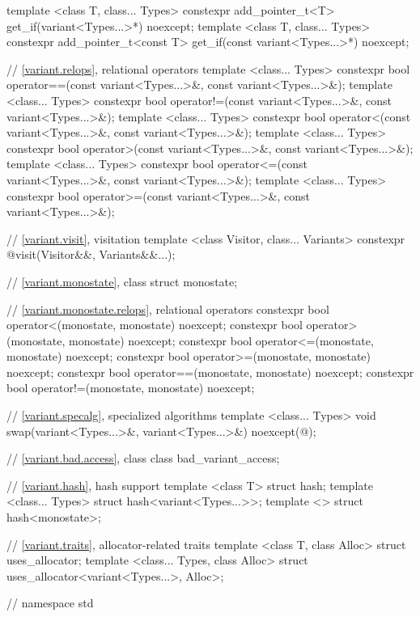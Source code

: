 \begin{codeblock}
{  template <class T, class... Types>
    constexpr add_pointer_t<T> get_if(variant<Types...>*) noexcept;
  template <class T, class... Types>
    constexpr add_pointer_t<const T> get_if(const variant<Types...>*) noexcept;

  // \ref{variant.relops}, relational operators
  template <class... Types>
    constexpr bool operator==(const variant<Types...>&,
                              const variant<Types...>&);
  template <class... Types>
    constexpr bool operator!=(const variant<Types...>&,
                              const variant<Types...>&);
  template <class... Types>
    constexpr bool operator<(const variant<Types...>&,
                             const variant<Types...>&);
  template <class... Types>
    constexpr bool operator>(const variant<Types...>&,
                             const variant<Types...>&);
  template <class... Types>
    constexpr bool operator<=(const variant<Types...>&,
                              const variant<Types...>&);
  template <class... Types>
    constexpr bool operator>=(const variant<Types...>&,
                              const variant<Types...>&);

  // \ref{variant.visit}, visitation
  template <class Visitor, class... Variants>
  constexpr @\seebelow@ visit(Visitor&&, Variants&&...);

  // \ref{variant.monostate}, class 
  struct monostate;

  // \ref{variant.monostate.relops},  relational operators
  constexpr bool operator<(monostate, monostate) noexcept;
  constexpr bool operator>(monostate, monostate) noexcept;
  constexpr bool operator<=(monostate, monostate) noexcept;
  constexpr bool operator>=(monostate, monostate) noexcept;
  constexpr bool operator==(monostate, monostate) noexcept;
  constexpr bool operator!=(monostate, monostate) noexcept;

  // \ref{variant.specalg}, specialized algorithms
  template <class... Types>
  void swap(variant<Types...>&, variant<Types...>&) noexcept(@\seebelow@);

  // \ref{variant.bad.access}, class 
  class bad_variant_access;

  // \ref{variant.hash}, hash support
  template <class T> struct hash;
  template <class... Types> struct hash<variant<Types...>>;
  template <> struct hash<monostate>;

  // \ref{variant.traits}, allocator-related traits
  template <class T, class Alloc> struct uses_allocator;
  template <class... Types, class Alloc>
  struct uses_allocator<variant<Types...>, Alloc>;
} // namespace std
\end{codeblock}

